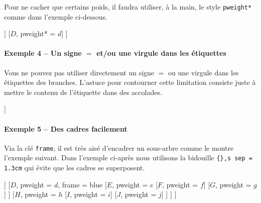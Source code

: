 \documentclass[12pt,a4paper]{article}
\theoremstyle{definition}
\begin{document}
Pour ne cacher que certains poids, il faudra utiliser, à la main, le style \verb+pweight*+ comme dans l'exemple ci-dessous.

\begin{latexex}
\begin{probatree}
    [
        [$A$, pweight = $a$
            [$B$, pweight* = $b$]
            [$C$, pweight  = $c$]
        ]
        [$D$, pweight* = $d$]
    ]
\end{probatree}
\end{latexex}




\paragraph{Exemple 4 -- Un signe $=$ et/ou une virgule dans les étiquettes}

Vous ne pouvez pas utiliser directement un signe $=$ ou une virgule dans les étiquettes des branches. L'astuce pour contourner cette limitation consiste juste à mettre le contenu de l'étiquette dans des accolades.

\begin{latexex}
\begin{probatree}
    [
        [$A$, apweight = {$a = 0,1$}]
        [$B$, bpweight = $b$]
    ]
\end{probatree}
\end{latexex}




\paragraph{Exemple 5 -- Des cadres facilement}

Via la clé \verb+frame+, il est très aisé d'encadrer un sous-arbre comme le montre l'exemple suivant. Dans l'exemple ci-après nous utilisons la bidouille \verb+{},s sep = 1.3cm+ qui évite que les cadres se superposent.

\begin{latexex}
\begin{probatree}
    [{}, s sep = 1.3cm 
        [$A$, pweight = $a$,
              frame   = red
            [$B$, pweight = $b$]
            [$C$, pweight = $c$]
        ]
        [$D$, pweight = $d$,
              frame   = blue
            [$E$, pweight = $e$
                [$F$, pweight = $f$]
                [$G$, pweight = $g$]
            ]
            [$H$, pweight = $h$
                [$I$, pweight = $i$]
                [$J$, pweight = $j$]
            ]
        ]
    ]
\end{probatree}
\end{latexex}
\end{document}
